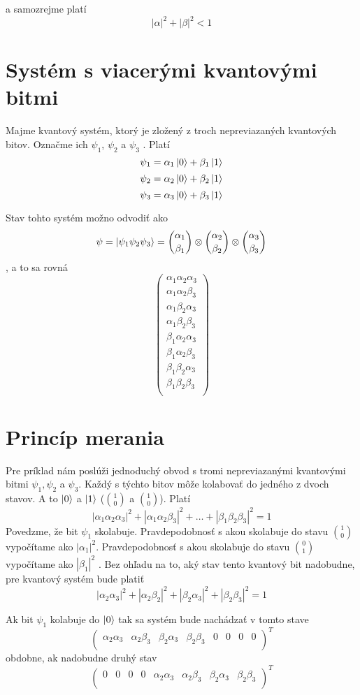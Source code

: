 a samozrejme platí
\[|\alpha|^{2} + |\beta|^{2} < 1\]

\section{Systém s viacerými kvantovými bitmi}
Majme kvantový systém, ktorý je zložený z troch nepreviazaných kvantových bitov.
Označme ich \(\psi_1\), \(\psi_2\) a \(\psi_3\) . Platí
\[\psi_1 = \alpha_1 \Ket{0} + \beta_1 \Ket{1}\]
\[\psi_2 = \alpha_2 \Ket{0} + \beta_2 \Ket{1}\]
\[\psi_3 = \alpha_3 \Ket{0} + \beta_3 \Ket{1}\]

Stav tohto systém možno odvodiť ako
\[\psi = \Ket{\psi_1 \psi_2 \psi_3} = \binom{\alpha_1}{\beta_1} \otimes \binom{\alpha_2}{\beta_2} \otimes \binom{\alpha_3}{\beta_3}\]
, a to sa rovná
\[
\begin{pmatrix}
    \alpha_1 \alpha_2 \alpha_3 \\
    \alpha_1 \alpha_2 \beta_3\\
    \alpha_1 \beta_2 \alpha_3\\
    \alpha_1 \beta_2 \beta_3\\
    \beta_1 \alpha_2 \alpha_3 \\
    \beta_1 \alpha_2 \beta_3\\
    \beta_1 \beta_2 \alpha_3\\
    \beta_1 \beta_2 \beta_3\\

 \end{pmatrix}
\]

\section{Princíp merania}
Pre príklad nám poslúži jednoduchý obvod s tromi nepreviazanými kvantovými 
bitmi \(\psi_1, \psi_2\) a \(\psi_3\). Každý s týchto bitov môže kolabovať do
jedného z dvoch stavov. A to \(\Ket{0}\) a \(\Ket{1}\) (\(\binom{1}{0}\) a
\(\binom{1}{0}\)). Platí
\[|\alpha_1\alpha_2\alpha_3|^2 + |\alpha_1\alpha_2\beta_3|^2 + \dots + |\beta_1\beta_2\beta_3|^2 = 1\]
Povedzme, že bit \(\psi_1\) skolabuje. Pravdepodobnosť s akou skolabuje do
stavu \(\binom{1}{0}\) vypočítame ako \(|\alpha_1|^2\). Pravdepodobnosť s akou 
skolabuje do stavu \(\binom{0}{1}\) vypočítame ako \(|\beta_1|^2\) \cite{Kit95}. Bez ohľadu
na to, aký stav tento kvantový bit nadobudne, pre kvantový systém bude platiť
\[|\alpha_2\alpha_3|^2 + |\alpha_2\beta_2|^2 + |\beta_2\alpha_3|^2 + |\beta_2\beta_3|^2 = 1\]

Ak bit \(\psi_1\) kolabuje do \(\Ket{0}\) tak sa systém bude nachádzať v tomto
stave
\[
\begin{pmatrix}
    \alpha_2 \alpha_3 &
    \alpha_2 \beta_3&
    \beta_2 \alpha_3&
    \beta_2 \beta_3&
    0&
    0&
    0&
    0\\
 \end{pmatrix}^T
\]
obdobne, ak nadobudne druhý stav
\[
\begin{pmatrix}
    0 & 0 & 0 & 0  & \alpha_2 \alpha_3 & \alpha_2 \beta_3 & \beta_2 \alpha_3 & \beta_2 \beta_3 \\
 \end{pmatrix}^T
\]
